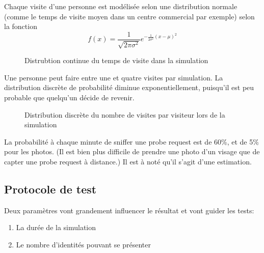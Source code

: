 Chaque visite d'une personne est modélisée selon une distribution normale (comme le temps de visite moyen dans un centre commercial par exemple) selon la fonction
\[f(x)=\frac{1}{\sqrt{2\pi \sigma^2}} e^{-\frac{1}{2\sigma^2}(x-\mu)^2}\]

\begin{figure}[H]
\caption{Distrubtion continue du temps de visite dans la simulation}
\end{figure}

Une personne peut faire entre une et quatre visites par simulation.
La distribution discrète de probabilité diminue exponentiellement, puisqu'il est peu probable que quelqu'un décide de revenir.

\begin{figure}[H]
  \caption{Distribution discrète du nombre de visites par visiteur lors de la simulation}
\end{figure}

La probabilité à chaque minute de sniffer une probe request est de 60\%, et de 5\% pour les photos. (Il est bien plus difficile de prendre une photo d'un visage que de 
capter une probe request à distance.) Il est à noté qu'il s'agit d'une estimation.

\subsection{Protocole de test}
Deux paramètres vont grandement influencer le résultat et vont guider les tests:
\begin{enumerate}
    \item La durée de la simulation
    \item Le nombre d'identités pouvant se présenter
\end{enumerate}

